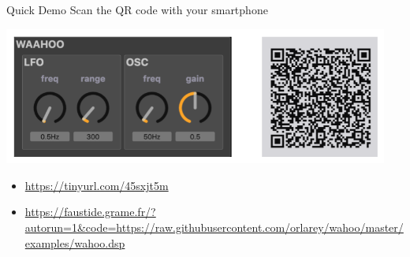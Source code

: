 
\begin{frame}[fragile]{Quick Demo}
    Scan the QR code with your smartphone
    \begin{center}
        \includegraphics[width=0.95\textwidth]{images/wahoo.png}
    \end{center}
    \begin{itemize}
        \item \url{https://tinyurl.com/45sxjt5m}
        \item \url{https://faustide.grame.fr/?autorun=1&code=https://raw.githubusercontent.com/orlarey/wahoo/master/examples/wahoo.dsp} 
    \end{itemize}
\end{frame}
